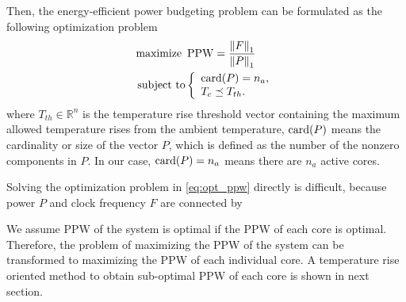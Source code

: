 Then, the energy-efficient power budgeting problem can be formulated as the following optimization problem
\begin{equation}\label{eq:opt_ppw}
\begin{split}
\text{maximize}~ & \ppw = \frac{\left \| F \right \|_{1}}{\left \| P \right \|_{1}}\\
\text{subject to} &\left\{
\begin{array}{lr}
\card(P) = n_{a},\\
T_{c} \preceq T_{th}.\\
\end{array}
\right.
\end{split}
\end{equation}
where $T_{th} \in \mathbb{R}^{n}$ is the temperature rise threshold
vector containing the maximum allowed temperature rises from the
ambient temperature, $\operatorname{card}(P)$ means the cardinality or size of the vector $P$, which is defined as the number of the nonzero components in $P$. In our case, $\operatorname{card}(P) = n_{a}$ means there are $n_{a}$ active cores.


Solving the optimization problem in \eqref{eq:opt_ppw} directly is
difficult, because power $P$ and clock frequency $F$ are connected by 

We assume PPW of the system is optimal if the PPW of each core is optimal. Therefore, the problem of maximizing the PPW of the system can be transformed to maximizing the PPW of each individual core. A temperature rise oriented method to obtain sub-optimal PPW of each core is shown in next section.




